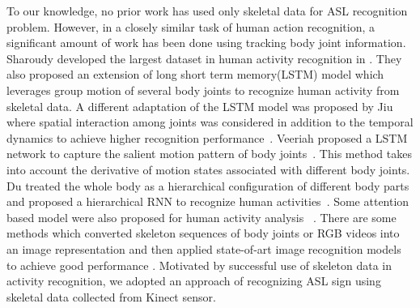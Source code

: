 \documentclass[10pt,twocolumn,letterpaper]{article}
\begin{document}
To our knowledge, no prior work has used only skeletal data for ASL recognition problem. However, in a closely similar task of human action recognition, a significant amount of work has been done using tracking body joint information. Sharoudy \etal developed the largest dataset in human activity recognition in \cite{7780484}. They also proposed an extension of long short term memory(LSTM) model which leverages group motion of several body joints to recognize human activity from skeletal data. A different adaptation of the LSTM model was proposed by Jiu \etal where spatial interaction among joints was considered in addition to the temporal dynamics to achieve higher recognition performance~\cite{8101019}. Veeriah \etal proposed a LSTM network to capture the salient motion pattern of body joints~\cite{7410817}. This method takes into account the derivative of motion states associated with different body joints. Du \etal treated the whole body as a hierarchical configuration of different body parts and proposed a hierarchical RNN to recognize human activities~\cite{7298714}. Some attention based model were also proposed for human activity analysis ~\cite{8226767, song2016end}. There are some methods which converted skeleton sequences of body joints or RGB videos into an image representation and then applied state-of-art image recognition models to achieve good performance \cite{DBLP:conf/cvpr/KeBASB17, DBLP:journals/corr/abs-1711-05941}.
Motivated by successful use of skeleton data in activity recognition, we adopted an approach of recognizing ASL sign using skeletal data collected from Kinect sensor.  
\end{document}
